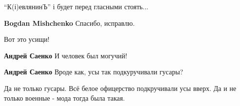  
 
 
 
 

\enquote{К(і)евлянинЪ} і будет перед гласными стоять...

\textbf{Bogdan Mishchenko} Спасибо, исправлю.

Вот это усищи!

\textbf{Андрей Саенко} И человек был могучий!

\textbf{Андрей Саенко} Вроде как, усы так подкуручивали гусары?


Да не только гусары. Всё белое офицерство подкручивали усы вверх. Да и не
только военные - мода тогда была такая.
